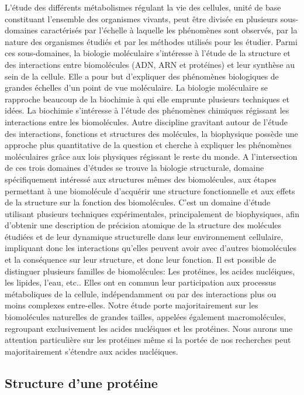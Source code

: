 L'étude des différents métabolismes régulant la vie des cellules, unité de base constituant l'ensemble des organismes vivants, peut être divisée en plusieurs sous-domaines caractérisés par l'échelle à laquelle les phénomènes sont observés, par la nature des organismes étudiés et par les méthodes utilisés pour les étudier. Parmi ces sous-domaines, la biologie moléculaire s'intéresse à l'étude de la structure et des interactions entre biomolécules (ADN, ARN et protéines) et leur synthèse au sein de la cellule. Elle a pour but d'expliquer des phénomènes biologiques de grandes échelles d'un point de vue moléculaire. La biologie moléculaire se rapproche beaucoup de la biochimie à qui elle emprunte plusieurs techniques et idées. La biochimie s'intéresse à l'étude des phénomènes chimiques régissant les interactions entre les biomolécules. Autre discipline gravitant autour de l'étude des interactions, fonctions et structures des molécules, la biophysique possède une approche plus quantitative de la question et cherche à expliquer les phénomènes moléculaires grâce aux lois physiques régissant le reste du monde. A l'intersection de ces trois domaines d'études se trouve la biologie structurale, domaine spécifiquement intéressé aux structures mêmes des biomolécules, aux étapes permettant à une biomolécule d'acquérir une structure fonctionnelle et aux effets de la structure sur la fonction des biomolécules. C'est un domaine d'étude utilisant plusieurs techniques expérimentales, principalement de biophysiques, afin d'obtenir une description de précision atomique de la structure des molécules étudiées et de leur dynamique structurelle dans leur environnement cellulaire, impliquant donc les interactions qu'elles peuvent avoir avec d'autres biomolécules et la conséquence sur leur structure, et donc leur fonction.
Il est possible de distinguer plusieurs familles de biomolécules: Les protéines, les acides nucléiques, les lipides, l'eau, etc.. Elles ont en commun leur participation aux processus métaboliques de la cellule, indépendamment ou par des interactions plus ou moins complexes entre-elles. Notre étude porte majoritairement sur les biomolécules naturelles de grandes tailles, appelées également macromolécules, regroupant exclusivement les acides nucléiques et les protéines. Nous aurons une attention particulière sur les protéines même si la portée de nos recherches peut majoritairement s'étendre aux acides nucléiques.

\subsection{Structure d'une protéine}

